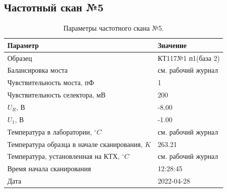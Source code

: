 \subsection{Частотный скан №5}
\begin{table}[!ht]
    \centering
    \caption{Параметры частотного скана №5.}
    \begin{tabular}{|l|l|}
        \hline
        Параметр                                       & Значение                  \\ \hline
        Образец                                        & КТ117№1 п1(база 2)        \\ \hline
        Балансировка моста                             & см. рабочий журнал        \\ \hline
        Чувствительность моста, пФ                     & 1                         \\ \hline
        Чувствительность селектора, мВ                 & 200                       \\ \hline
        $U_R$, В                                       & -8.00                     \\ \hline
        $U_1$, В                                       & -1.00                     \\ \hline
        Температура в лаборатории, $^\circ C$          & см. рабочий журнал        \\ \hline
        Температура образца в начале сканирования, $K$ & 263.21                    \\ \hline
        Температура, установленная на КТХ, $^\circ C$  & см. рабочий журнал        \\ \hline
        Время начала сканирования                      & 12:28:45                  \\ \hline
        Дата                                           & 2022-04-28                \\ \hline
    \end{tabular}
    \label{table:frequency_scan_5}
\end{table}

